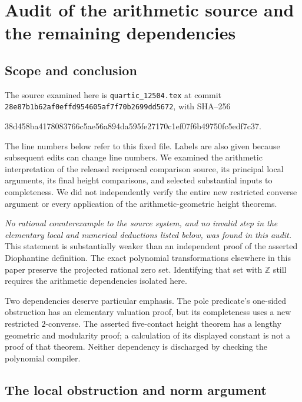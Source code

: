\section{Audit of the arithmetic source and the remaining dependencies}
\label{sec:arithmetic-source-audit}

\subsection{Scope and conclusion}

The source examined here is \texttt{quartic\_12504.tex} at commit
\texttt{28e87b1b62af0effd954605af7f70b2699dd5672}, with SHA--256
\begin{center}\footnotesize\ttfamily
38d458ba4178083766c5ae56a894da595fe27170c1ef07f6b49750fc5edf7c37.
\end{center}
The line numbers below refer to this fixed file.  Labels are also given
because subsequent edits can change line numbers.  We examined the
arithmetic interpretation of the released reciprocal comparison source,
its principal local arguments, its final height comparisons, and selected
substantial inputs to completeness.  We did not independently verify the
entire new restricted converse argument or every application of the
arithmetic-geometric height theorems.

\emph{No rational counterexample to the source system, and no invalid
step in the elementary local and numerical deductions listed below, was
found in this audit.}  This statement is substantially weaker than an
independent proof of the asserted Diophantine definition.  The exact
polynomial transformations elsewhere in this paper preserve the projected
rational zero set.  Identifying that set with $\mathbb Z$ still requires
the arithmetic dependencies isolated here.

Two dependencies deserve particular emphasis.  The pole predicate's
one-sided obstruction has an elementary valuation proof, but its
completeness uses a new restricted $2$-converse.  The asserted
five-contact height theorem has a lengthy geometric and modularity proof;
a calculation of its displayed constant is not a proof of that theorem.
Neither dependency is discharged by checking the polynomial compiler.

\subsection{The local obstruction and norm argument}

